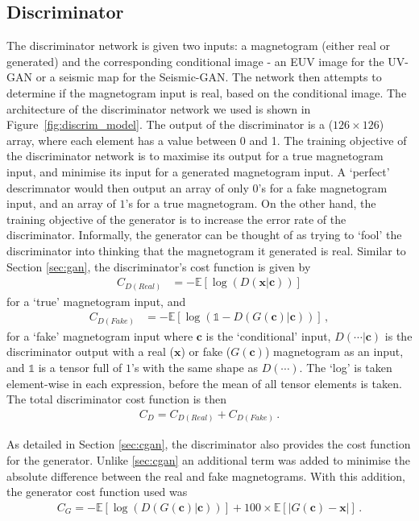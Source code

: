 \documentclass[11pt,a4paper,onecolumn]{report}
\begin{document}
\subsection{Discriminator}
The discriminator network is given two inputs: a magnetogram (either real or
generated) and the corresponding conditional image - an EUV image for the UV-GAN
or a seismic map for the Seismic-GAN. The network then attempts to determine if
the magnetogram input is real, based on the conditional image. The architecture
of the discriminator network we used is shown in Figure~\ref{fig:discrim_model}.
The output of the discriminator is a ($126\times 126$) array, where each element
has a value between 0 and 1. The training objective of the discriminator network
is to maximise its output for a true magnetogram input, and minimise its input
for a generated magnetogram input. A `perfect' descrimnator would then output an
array of only $0$'s for a fake magnetogram input, and an array of $1$'s for a
true magnetogram. On the other hand, the training objective of the generator is
to increase the error rate of the discriminator. Informally, the generator can be
thought of as trying to `fool' the discriminator into thinking that the magnetogram
it generated is real. Similar to Section \ref{sec:gan}, the discriminator's cost
function is given by
\begin{align}
  C_{D(Real)} &= -\mathds{E}\left[\log(D(\mathbf{x}|\mathbf{c}))\right]
\end{align}
for a `true' magnetogram input, and
\begin{align}
  C_{D(Fake)} &=  -\mathds{E}\left[\log(\mathds{1} -  D(G(\mathbf{c})|\mathbf{c}) ) \right]\,,
\end{align}
for a `fake' magnetogram input where $\mathbf{c}$ is the `conditional' input,
$D(\dotsb|\mathbf{c})$ is the discriminator output with a real ($\mathbf{x}$) or
fake ($G(\mathbf{c})$) magnetogram as an input, and $\mathds{1}$ is a tensor
full of $1$'s with the same shape as $D(\dotsb)$. The `log' is taken
element-wise in each expression, before the mean of all tensor elements is
taken. The total discriminator cost function is then
\begin{align}
  C_{D} = C_{D(Real)} + C_{D(Fake)} \,. \label{eqn:d_loss}
\end{align}
\par
As detailed in Section \ref{sec:cgan}, the discriminator also provides the cost
function for the generator. Unlike \ref{sec:cgan} an additional term was added
to minimise the absolute difference between the real and fake magnetograms. With
this addition, the generator cost function used was
\begin{align}
  C_{G} = -\mathds{E}\left[\log(D(G(\mathbf{c})|\mathbf{c}))\right] +
  100 \times \mathds{E}\left[|G(\mathbf{c}) - \mathbf{x}|\right] \,.\label{eqn:G_loss}
\end{align}
\end{document}
